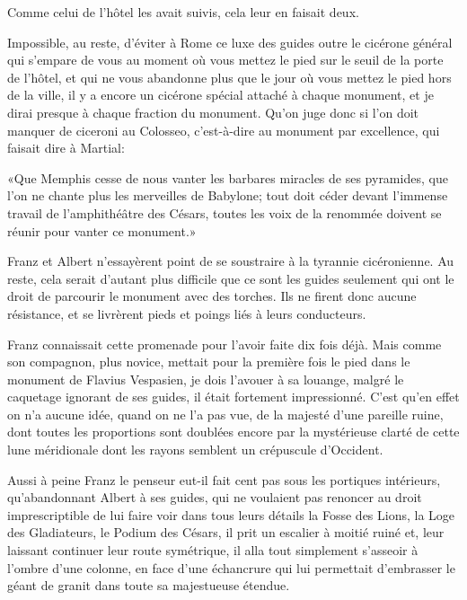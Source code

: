 Comme celui de l'hôtel les avait suivis, cela leur en faisait deux. 

Impossible, au reste, d'éviter à Rome ce luxe des guides outre le cicérone général qui s'empare de vous au moment où vous mettez le pied sur le seuil de la porte de l'hôtel, et qui ne vous abandonne plus que le jour où vous mettez le pied hors de la ville, il y a encore un cicérone spécial attaché à chaque monument, et je dirai presque à chaque fraction du monument. Qu'on juge donc si l'on doit manquer de ciceroni au Colosseo, c'est-à-dire au monument par excellence, qui faisait dire à Martial: 

«Que Memphis cesse de nous vanter les barbares miracles de ses pyramides, que l'on ne chante plus les merveilles de Babylone; tout doit céder devant l'immense travail de l'amphithéâtre des Césars, toutes les voix de la renommée doivent se réunir pour vanter ce monument.» 

Franz et Albert n'essayèrent point de se soustraire à la tyrannie cicéronienne. Au reste, cela serait d'autant plus difficile que ce sont les guides seulement qui ont le droit de parcourir le monument avec des torches. Ils ne firent donc aucune résistance, et se livrèrent pieds et poings liés à leurs conducteurs. 

Franz connaissait cette promenade pour l'avoir faite dix fois déjà. Mais comme son compagnon, plus novice, mettait pour la première fois le pied dans le monument de Flavius Vespasien, je dois l'avouer à sa louange, malgré le caquetage ignorant de ses guides, il était fortement impressionné. C'est qu'en effet on n'a aucune idée, quand on ne l'a pas vue, de la majesté d'une pareille ruine, dont toutes les proportions sont doublées encore par la mystérieuse clarté de cette lune méridionale dont les rayons semblent un crépuscule d'Occident. 

Aussi à peine Franz le penseur eut-il fait cent pas sous les portiques intérieurs, qu'abandonnant Albert à ses guides, qui ne voulaient pas renoncer au droit imprescriptible de lui faire voir dans tous leurs détails la Fosse des Lions, la Loge des Gladiateurs, le Podium des Césars, il prit un escalier à moitié ruiné et, leur laissant continuer leur route symétrique, il alla tout simplement s'asseoir à l'ombre d'une colonne, en face d'une échancrure qui lui permettait d'embrasser le géant de granit dans toute sa majestueuse étendue. 

